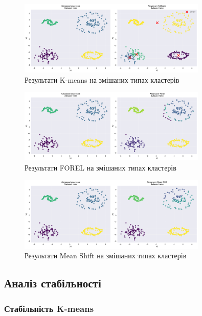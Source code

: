 \documentclass[12pt,a4paper]{article}
\begin{document}
\begin{figure}[H]
\centering
\includegraphics[width=0.8\textwidth]{clustering_visualizations/K-means_Змішані_типи_results.png}
\caption{Результати K-means на змішаних типах кластерів}
\label{fig:kmeans_mixed}
\end{figure}

\begin{figure}[H]
\centering
\includegraphics[width=0.8\textwidth]{clustering_visualizations/FOREL_Змішані_типи_results.png}
\caption{Результати FOREL на змішаних типах кластерів}
\label{fig:forel_mixed}
\end{figure}

\begin{figure}[H]
\centering
\includegraphics[width=0.8\textwidth]{clustering_visualizations/Mean Shift_Змішані_типи_results.png}
\caption{Результати Mean Shift на змішаних типах кластерів}
\label{fig:meanshift_mixed}
\end{figure}

\subsection{Аналіз стабільності}

\subsubsection{Стабільність K-means}
\end{document}
